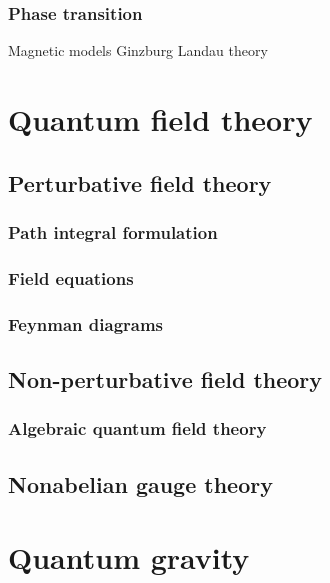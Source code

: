 \documentclass{../note}
\begin{document}
\section{Phase transition}
Magnetic models
Ginzburg Landau theory







\part{Quantum field theory}
\chapter{Perturbative field theory}
\section{Path integral formulation}
\section{Field equations}
\section{Feynman diagrams}

\chapter{Non-perturbative field theory}
\section{Algebraic quantum field theory}

\chapter{Nonabelian gauge theory}





\part{Quantum gravity}
\end{document}
